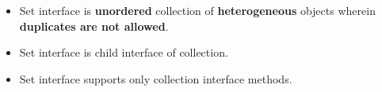 \setlength{\columnsep}{3pt}
\begin{flushleft}

	\begin{itemize}
		
		\item Set interface is \textbf{unordered} collection of \textbf{heterogeneous} objects wherein \textbf{duplicates are not allowed}.
		\item Set interface is child interface of collection.
		\item Set interface supports only collection interface methods.
		

		
		
	\end{itemize}	
	
\end{flushleft}

\newpage

